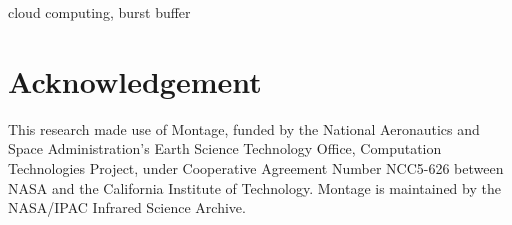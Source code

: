 \documentclass[10pt, conference, compsocconf]{IEEEtran}
\begin{document}
\begin{IEEEkeywords}
	cloud computing, burst buffer
\end{IEEEkeywords}

\IEEEpeerreviewmaketitle















\section*{Acknowledgement}
This research made use of Montage, funded by the National Aeronautics and Space Administration's
Earth Science Technology Office, Computation Technologies Project, under Cooperative Agreement Number NCC5-626 between NASA and the California Institute of Technology. Montage is maintained by the NASA/IPAC Infrared Science Archive.

\end{document}
